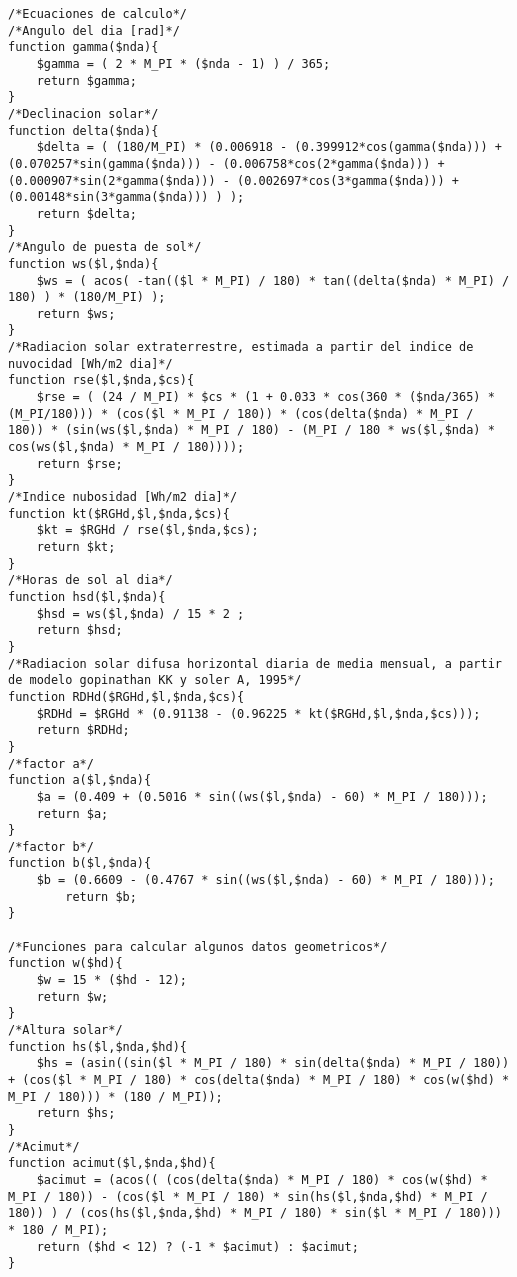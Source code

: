 \begin{verbatim}
/*Ecuaciones de calculo*/
/*Angulo del dia [rad]*/
function gamma($nda){
	$gamma = ( 2 * M_PI * ($nda - 1) ) / 365;
	return $gamma;
}
/*Declinacion solar*/
function delta($nda){
	$delta = ( (180/M_PI) * (0.006918 - (0.399912*cos(gamma($nda))) + (0.070257*sin(gamma($nda))) - (0.006758*cos(2*gamma($nda))) + (0.000907*sin(2*gamma($nda))) - (0.002697*cos(3*gamma($nda))) + (0.00148*sin(3*gamma($nda))) ) );
	return $delta;
}
/*Angulo de puesta de sol*/
function ws($l,$nda){
	$ws = ( acos( -tan(($l * M_PI) / 180) * tan((delta($nda) * M_PI) / 180) ) * (180/M_PI) );
	return $ws;
}
/*Radiacion solar extraterrestre, estimada a partir del indice de nuvocidad [Wh/m2 dia]*/
function rse($l,$nda,$cs){
	$rse = ( (24 / M_PI) * $cs * (1 + 0.033 * cos(360 * ($nda/365) * (M_PI/180))) * (cos($l * M_PI / 180)) * (cos(delta($nda) * M_PI / 180)) * (sin(ws($l,$nda) * M_PI / 180) - (M_PI / 180 * ws($l,$nda) * cos(ws($l,$nda) * M_PI / 180))));
	return $rse;
}
/*Indice nubosidad [Wh/m2 dia]*/
function kt($RGHd,$l,$nda,$cs){
	$kt = $RGHd / rse($l,$nda,$cs);
	return $kt;
}
/*Horas de sol al dia*/
function hsd($l,$nda){
	$hsd = ws($l,$nda) / 15 * 2 ;
	return $hsd;
}
/*Radiacion solar difusa horizontal diaria de media mensual, a partir de modelo gopinathan KK y soler A, 1995*/
function RDHd($RGHd,$l,$nda,$cs){
	$RDHd = $RGHd * (0.91138 - (0.96225 * kt($RGHd,$l,$nda,$cs)));
	return $RDHd;
}
/*factor a*/
function a($l,$nda){
	$a = (0.409 + (0.5016 * sin((ws($l,$nda) - 60) * M_PI / 180)));
	return $a;
}
/*factor b*/
function b($l,$nda){
	$b = (0.6609 - (0.4767 * sin((ws($l,$nda) - 60) * M_PI / 180)));
        return $b;
}

/*Funciones para calcular algunos datos geometricos*/
function w($hd){
	$w = 15 * ($hd - 12);
	return $w;
}
/*Altura solar*/
function hs($l,$nda,$hd){
	$hs = (asin((sin($l * M_PI / 180) * sin(delta($nda) * M_PI / 180)) + (cos($l * M_PI / 180) * cos(delta($nda) * M_PI / 180) * cos(w($hd) * M_PI / 180))) * (180 / M_PI));
	return $hs;
}
/*Acimut*/
function acimut($l,$nda,$hd){
	$acimut = (acos(( (cos(delta($nda) * M_PI / 180) * cos(w($hd) * M_PI / 180)) - (cos($l * M_PI / 180) * sin(hs($l,$nda,$hd) * M_PI / 180)) ) / (cos(hs($l,$nda,$hd) * M_PI / 180) * sin($l * M_PI / 180))) * 180 / M_PI);
	return ($hd < 12) ? (-1 * $acimut) : $acimut;
}	 


\end{verbatim}
